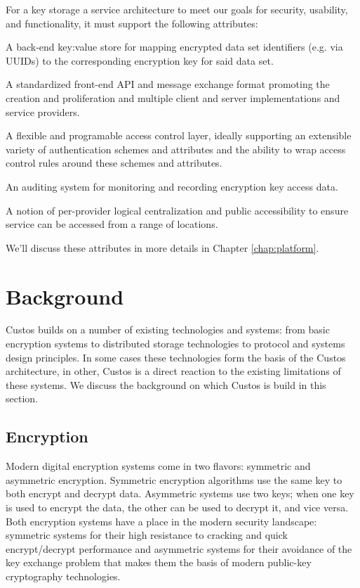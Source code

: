 For a key storage a service architecture to meet our goals for
security, usability, and functionality, it must support the following
attributes:

\begin{packed_item}
\item A back-end key:value store for mapping encrypted data set
  identifiers (e.g. via UUIDs) to the corresponding encryption key for
  said data set.
\item A standardized front-end API and message exchange format
  promoting the creation and proliferation and multiple client and
  server implementations and service providers.
\item A flexible and programable access control layer,
  ideally supporting an extensible variety of authentication schemes and
  attributes and the ability to wrap access control rules around these
  schemes and attributes.
\item An auditing system for monitoring and recording
  encryption key access data.
\item A notion of per-provider logical centralization and public
  accessibility to ensure service can be accessed from a range of
  locations.
\end{packed_item}

We'll discuss these attributes in more details in Chapter
\ref{chap:platform}.

\section{Background}

Custos builds on a number of existing technologies and systems: from
basic encryption systems to distributed storage technologies to
protocol and systems design principles. In some cases these
technologies form the basis of the Custos architecture, in other,
Custos is a direct reaction to the existing limitations of these
systems. We discuss the background on which Custos is build in this
section.

\subsection{Encryption}

Modern digital encryption systems come in two flavors: symmetric and
asymmetric encryption. Symmetric encryption algorithms use the same
key to both encrypt and decrypt data. Asymmetric systems use two keys;
when one key is used to encrypt the data, the other can be used to
decrypt it, and vice versa. Both encryption systems have a place in
the modern security landscape: symmetric systems for their high
resistance to cracking and quick encrypt/decrypt performance and
asymmetric systems for their avoidance of the key exchange problem
that makes them the basis of modern public-key cryptography
technologies.

